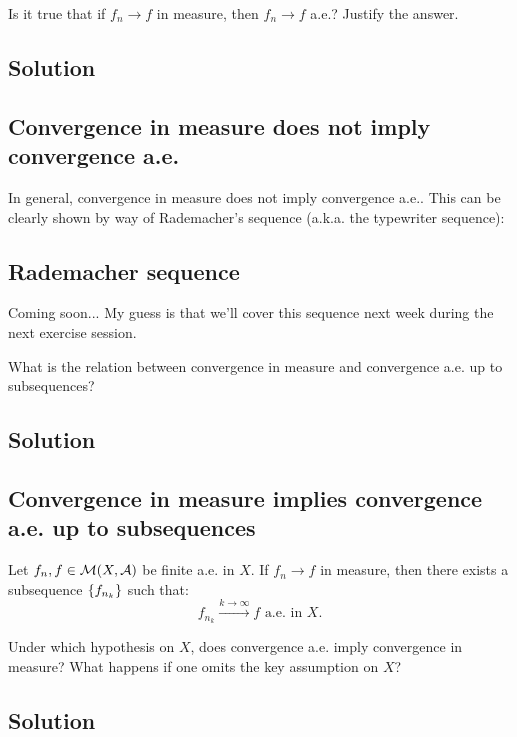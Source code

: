 \sheet


\question
Is it true that if $f_n \to f$ in measure, then $f_n \to f$ a.e.? Justify the answer.

\subsection*{Solution}

\subsection{Convergence in measure does not imply convergence a.e.}
In general, convergence in measure does not imply convergence a.e.. This can be clearly shown by way of Rademacher's sequence (a.k.a. the typewriter sequence):

\subsection{Rademacher sequence}
Coming soon...
My guess is that we'll cover this sequence next week during the next exercise session.


\question
What is the relation between convergence in measure and convergence a.e. up to subsequences?

\subsection*{Solution}

\subsection{Convergence in measure implies convergence a.e. up to subsequences} \label{measure->aesubs}
Let $f_n,f \in \mathcal{M}(X,\mathcal{A})$ be finite a.e. in $X$. If $f_n \to f$ in measure, then there exists a subsequence $\{ f_{n_k} \}$ such that:
\[
    f_{n_k} \xrightarrow{k\to\infty} f \text{ a.e. in } X.
\]


\question
Under which hypothesis on $X$, does convergence a.e. imply convergence in measure? What happens if one omits the key assumption on $X$?

\subsection*{Solution}

